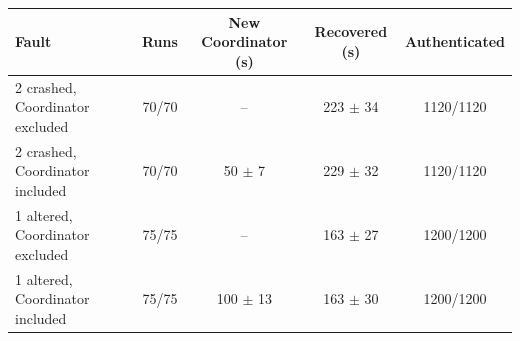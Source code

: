 \begin{tabular}{lcccc}
\hline
\textbf{Fault} & \textbf{Runs} & \textbf{New Coordinator (s)} & \textbf{Recovered (s)} & \textbf{Authenticated} \\
\hline
2 crashed, Coordinator excluded & 70/70 & -- & 223 $\pm$ 34 & 1120/1120 \\
2 crashed, Coordinator included & 70/70 & 50 $\pm$ 7 & 229 $\pm$ 32 & 1120/1120 \\
1 altered, Coordinator excluded & 75/75 & -- & 163 $\pm$ 27 & 1200/1200 \\
1 altered, Coordinator included & 75/75 & 100 $\pm$ 13 & 163 $\pm$ 30 & 1200/1200 \\
\hline
\end{tabular}
